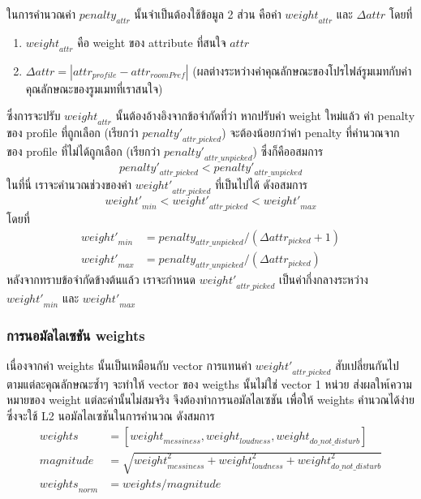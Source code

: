 ในการคำนวณค่า $\mathit{penalty}_\mathit{attr}$ นั้นจำเป็นต้องใช้ข้อมูล 2 ส่วน คือค่า $\mathit{weight}_\mathit{attr}$ และ $\Delta \mathit{attr}$ โดยที่
\begin{enumerate}
  \item $\mathit{weight}_\mathit{attr}$ คือ weight ของ attribute ที่สนใจ $\mathit{attr}$
  \item $\Delta \mathit{attr} = |\mathit{attr}_\mathit{profile} -\mathit{attr}_\mathit{roomPref}|$ (ผลต่างระหว่างค่าคุณลักษณะของโปรไฟล์รูมเมทกับค่าคุณลักษณะของรูมเมทที่เราสนใจ)
\end{enumerate}
ซึ่งการจะปรับ $\mathit{weight}_\mathit{attr}$ นั้นต้องอ้างอิงจากข้อจำกัดที่ว่า หากปรับค่า weight ใหม่แล้ว ค่า penalty ของ profile ที่ถูกเลือก (เรียกว่า
$\mathit{penalty'}_\mathit{attr\_picked}$) จะต้องน้อยกว่าค่า penalty ที่คำนวณจาก ของ profile ที่ไม่ได้ถูกเลือก (เรียกว่า
$\mathit{penalty'}_\mathit{attr\_unpicked}$) ซึ่งก็คืออสมการ
\begin{equation}
  \mathit{penalty'}_\mathit{attr\_picked} < \mathit{penalty'}_\mathit{attr\_unpicked}
\end{equation}
%
ในที่นี่ เราจะคำนวณช่วงของค่า $\mathit{weight'}_\mathit{attr\_picked}$ ที่เป็นไปได้ ดังอสมการ
\begin{equation}
  \mathit{weight'}_\mathit{min}
  < \mathit{weight'}_\mathit{attr\_picked} 
  < \mathit{weight'}_\mathit{max} 
\end{equation}
โดยที่
\begin{align}
  \mathit{weight'}_\mathit{min} &= \mathit{penalty}_\mathit{attr\_unpicked}/(\Delta \mathit{attr}_\mathit{picked} + 1) \\
  \mathit{weight'}_\mathit{max} &= \mathit{penalty}_\mathit{attr\_unpicked}/(\Delta \mathit{attr}_\mathit{picked})
\end{align}
หลังจากทราบข้อจำกัดข้างต้นแล้ว เราจะกำหนด $\mathit{weight'}_\mathit{attr\_picked}$ เป็นค่ากึ่งกลางระหว่าง $\mathit{weight'}_\mathit{min}$ 
และ $\mathit{weight'}_\mathit{max}$

\subsubsection{การนอมัลไลเซชัน weights} 
เนื่องจากค่า weights นั้นเป็นเหมือนกับ vector การแทนค่า $\mathit{weight'}_\mathit{attr\_picked}$ สับเปลี่ยนกันไปตามแต่ละคุณลักษณะซ้ำๆ 
จะทำให้ vector ของ weigths นั้นไม่ใช่ vector 1 หน่วย ส่งผลใหเ้ความหมายของ weight แต่ละค่านั้นไม่สมจริง จึงต้องทำการนอมัลไลเซชัน
เพื่อให้ weights คำนวณได้ง่าย ซึ่งจะใช้ L2 นอมัลไลเซชันในการคำนวณ ดังสมการ
\begin{align}
  \mathit{weights} &= [\mathit{weight}_\mathit{messiness}, \mathit{weight}_\mathit{loudness}, \mathit{weight}_\mathit{do\_not\_disturb}] \\
  \mathit{magnitude} &= \sqrt{\mathit{weight}_\mathit{messiness}^2 + \mathit{weight}_\mathit{loudness}^2 + \mathit{weight}_\mathit{do\_not\_disturb}^2} \\
  \mathit{weights}_\mathit{norm} &= \mathit{weights} / \mathit{magnitude}
\end{align}


